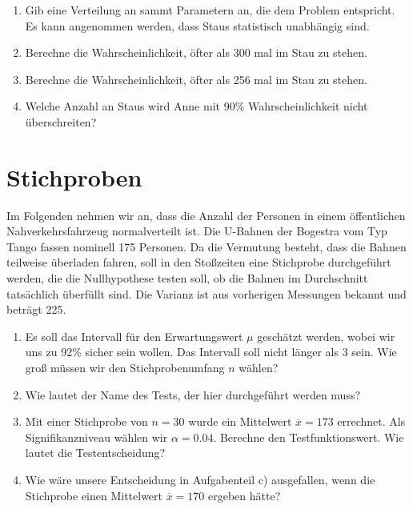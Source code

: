 \documentclass[11pt, a4paper]{article}
\begin{document}
\begin{enumerate}[label=\alph*)]
	\item Gib eine Verteilung an sammt Parametern an, die dem Problem entspricht. Es kann angenommen werden, dass Staus statistisch unabhängig sind.
	\item Berechne die Wahrscheinlichkeit, öfter als 300 mal im Stau zu stehen.
	\item Berechne die Wahrscheinlichkeit, öfter als 256 mal im Stau zu stehen.
	\item Welche Anzahl an Staus wird Anne mit 90\% Wahrscheinlichkeit nicht überschreiten?
\end{enumerate}

\newpage
\section{Stichproben}

Im Folgenden nehmen wir an, dass die Anzahl der Personen in einem öffentlichen Nahverkehrsfahrzeug normalverteilt ist. Die U-Bahnen der Bogestra vom Typ Tango fassen nominell 175 Personen. Da die Vermutung besteht, dass die Bahnen teilweise überladen fahren, soll in den Stoßzeiten eine Stichprobe durchgeführt werden, die die Nullhypothese testen soll, ob die Bahnen im Durchschnitt tatsächlich überfüllt sind. Die Varianz ist aus vorherigen Messungen bekannt und beträgt 225.

\begin{enumerate}[label=\alph*)]
\item Es soll das Intervall für den Erwartungswert $\mu$ geschätzt werden, wobei wir uns zu 92\% sicher sein wollen. Das Intervall soll nicht länger als 3 sein. Wie groß müssen wir den Stichprobenumfang $n$ wählen?\\
\item Wie lautet der Name des Tests, der hier durchgeführt werden muss?\\
\item Mit einer Stichprobe von $n = 30$ wurde ein Mittelwert $\overline{x} = 173$ errechnet. Als Signifikanzniveau wählen wir $\alpha = 0.04$. Berechne den Testfunktionswert. Wie lautet die Testentscheidung?\\
\item Wie wäre unsere Entscheidung in Aufgabenteil c) ausgefallen, wenn die Stichprobe einen Mittelwert $\overline{x} = 170$ ergeben hätte?\\
\end{enumerate}
\end{document}
